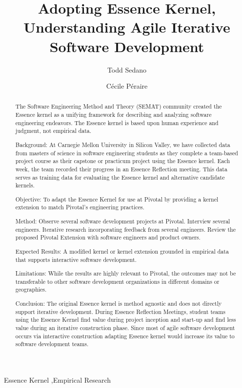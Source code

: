 \documentclass[preprint,12pt,3p]{elsarticle}
\begin{document}
\begin{frontmatter}

\title{Adopting Essence Kernel, Understanding Agile Iterative Software Development}

\author{Todd Sedano}

\author{C\'ecile P\'eraire}

\address{Carnegie Mellon University}
\address{Silicon Valley Campus}
\address{Moffett Field, CA 94035, USA}


\begin{abstract}
The Software Engineering Method and Theory (SEMAT) community created the Essence kernel as a unifying framework for describing and analyzing software engineering endeavors. The Essence kernel is based upon human experience and judgment, not empirical data. 

Background: At Carnegie Mellon University in Silicon Valley, we have collected data from masters of science in software engineering students as they complete a team-based project course as their capstone or practicum project using the Essence kernel. Each week, the team recorded their progress in an Essence Reflection meeting. This data serves as training data for evaluating the Essence kernel and alternative candidate kernels.

Objective: To adapt the Essence Kernel for use at Pivotal by providing a kernel extension to match Pivotal's engineering practices.

Method: Observe several software development projects at Pivotal. Interview several engineers. Iterative research incorporating feedback from several engineers. Review the proposed Pivotal Extension with software engineers and product owners. 

Expected Results: A modified kernel or kernel extension grounded in empirical data that supports interactive software development. 

Limitations: While the results are highly relevant to Pivotal, the outcomes may not be transferable to other software development organizations in different domains or geographies.

Conclusion: The original Essence kernel is method agnostic and does not directly support iterative development. During Essence Reflection Meetings, student teams using the Essence Kernel find value during project inception and start-up and find less value during an iterative construction phase. Since most of agile software development occurs via interactive construction adapting Essence kernel would increase its value to software development teams.

\end{abstract}

\begin{keyword}
Essence Kernel \sep Empirical Research
\end{keyword}

\end{frontmatter}
\end{document}
